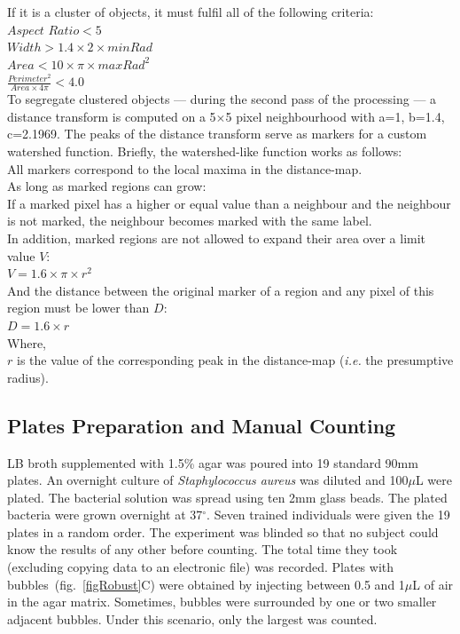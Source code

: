 \documentclass[10pt]{article}
\newcommand{\N}{Seven}
\newcommand{\sa}{\emph{Staphylococcus aureus}}
\begin{document}
If it is a cluster of objects, it must fulfil all of the following criteria:\\
\newline{}
$Aspect$ $Ratio < 5$\\
$Width > 1.4\times{}2\times{}minRad $\\
$Area < 10 \times{}\pi\times{}{maxRad}^2$\\
$\frac{Perimeter^2}{Area \times{} 4\pi } < 4.0$
\newline{}\\
To segregate clustered objects --- during the second pass of the processing ---
a distance transform is computed on a 5$\times{}$5 pixel neighbourhood with a=1, b=1.4, c=2.1969. 
The peaks of the distance transform serve as markers for a custom watershed
function. Briefly, the watershed-like function works as follows:\\
All markers correspond to the local maxima in the distance-map.\\
As long as marked regions can grow:\\  
If a marked pixel has a higher or equal value than a neighbour and the neighbour
is not marked, the neighbour becomes marked with the same label.\\
In addition, marked regions are not allowed to expand their area over a limit value $V$:\\
 $V = 1.6\times{}\pi\times{}{r}^2$ \\
 And the distance between the original marker of a region and any pixel of this region must be lower than $D$:\\
 $D = 1.6\times{}{r}$\\
 \newline{}
 Where,\\
 $r$ is the value of the corresponding peak in the distance-map (\emph{i.e.} the
 presumptive radius).
 

\subsection*{Plates Preparation and Manual Counting}
LB broth supplemented with 1.5\% agar was poured into 19 standard 90mm plates.
An overnight culture of \sa{} was diluted and 100$\mu{}$L were plated. The bacterial
solution was spread using ten 2mm glass beads. The plated bacteria were grown
overnight at 37$^{\circ}$.
\N{} trained individuals were given the 19 plates in a random order. The
experiment was blinded so that no subject could know the results of any other before counting.
The total time they took (excluding copying data to an electronic file) was
recorded.
Plates with bubbles~(fig.~\ref{figRobust}C) were obtained by injecting between 0.5 and 1$\mu{}$L of air in the agar matrix.
Sometimes, bubbles were surrounded by one or two smaller adjacent bubbles. Under this scenario, only the largest was counted.
\end{document}
